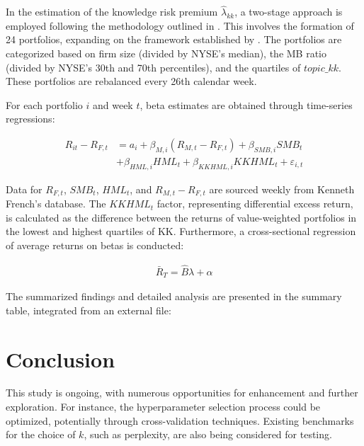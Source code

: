 \documentclass[12pt, letterpaper]{article}
\begin{document}
In the estimation of the knowledge risk premium \(\widehat{\lambda}_{kk}\), a two-stage approach is employed following the methodology outlined in \cite{Goyal2012-ct}. This involves the formation of 24 portfolios, expanding on the framework established by \cite{Fama1993-da}. The portfolios are categorized based on firm size (divided by NYSE's median), the MB ratio (divided by NYSE's 30th and 70th percentiles), and the quartiles of \(topic\_kk\). These portfolios are rebalanced every 26th calendar week.

For each portfolio \(i\) and week \(t\), beta estimates are obtained through time-series regressions:

\begin{align*}
    R_{it} - R_{F,t} &= a_i + \beta_{M, i}(R_{M,t} - R_{F,t}) + \beta_{SMB, i} SMB_t \\
    &+ \beta_{HML, i} HML_t + \beta_{KKHML, i} KKHML_t + \varepsilon_{i,t}
\end{align*}

Data for \(R_{F,t}\), \(SMB_t\), \(HML_t\), and \(R_{M,t} - R_{F,t}\) are sourced weekly from Kenneth French's database. The \(KKHML_t\) factor, representing differential excess return, is calculated as the difference between the returns of value-weighted portfolios in the lowest and highest quartiles of KK. Furthermore, a cross-sectional regression of average returns on betas is conducted:

\begin{align}
    \bar{R}_T = \widehat{B} \lambda + \alpha
\end{align}

The summarized findings and detailed analysis are presented in the summary table, integrated from an external file:




\section{Conclusion}

This study is ongoing, with numerous opportunities for enhancement and further exploration. For instance, the hyperparameter selection process could be optimized, potentially through cross-validation techniques. Existing benchmarks for the choice of $k$, such as perplexity, are also being considered for testing.
\end{document}
